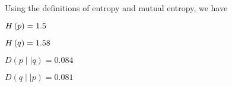 \documentclass[ClusteringConnectionsMAIN.tex]{subfiles}
\begin{document}
	

  Using the definitions of entropy and mutual entropy, we have

$H \left( p \right) = 1.5$  \newline

$H \left( q \right) = 1.58$ \newline

$D \left( p \mid \mid q \right) = 0.084$  \newline

$D \left( q \mid \mid p \right) = 0.081$
\end{document}
